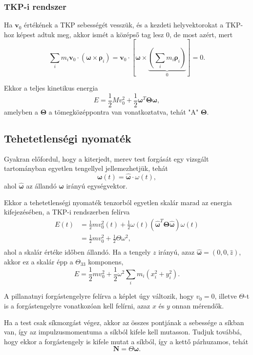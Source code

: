 \documentclass[12pt,a4paper]{scrartcl}
\let\mathbf\bm
\begin{document}
\subsubsection{TKP-i rendszer}
Ha ${{\mathbf{v}}_0}$ értékének a TKP sebességét vesszük, és a kezdeti helyvektorokat a TKP-hoz képest adtuk meg, akkor ismét a középső tag lesz 0, de most azért, mert
\[\sum\limits_i {{m_i}{{\mathbf{v}}_0} \cdot \left( {{\mathbf{\omega }} \times {{\mathbf{\rho }}_i}} \right)}  = {{\mathbf{v}}_0} \cdot \left[ {{\mathbf{\omega }} \times \underbrace {\left( {\sum\limits_i {{m_i}{{\mathbf{\rho }}_i}} } \right)}_0} \right] = 0.\]

Ekkor a teljes kinetikus energia
\[E = \frac{1}{2}Mv_0^2 + \frac{1}{2}{{\mathbf{\omega }}^T}{\mathbf{\Theta \omega }},\]
amelyben a ${\mathbf{\Theta }}$ a tömegközéppontra van vonatkoztatva, tehát "A" ${\mathbf{\Theta }}$.

\subsection{Tehetetlenségi nyomaték}
Gyakran előfordul, hogy a kiterjedt, merev test forgását egy vizsgált tartományban egyetlen tengellyel jellemezhetjük, tehát 
\[{\mathbf{\omega }}\left( t \right) = {\mathbf{\hat \omega }} \cdot \omega \left( t \right),\]
ahol ${\mathbf{\hat \omega }}$ az állandó ${\mathbf{\omega }}$ irányú egységvektor.

Ekkor a tehetetlenségi nyomaték tenzorból egyetlen skalár marad az energia kifejezésében, a TKP-i rendszerben felírva
\[\begin{aligned}
  E\left( t \right) &  = \frac{1}{2}mv_0^2\left( t \right) + \frac{1}{2}\omega \left( t \right)\left( {{{{\mathbf{\hat \omega }}}^T}{\mathbf{\Theta \hat \omega }}} \right)\omega \left( t \right) \\ 
   &  = \frac{1}{2}mv_0^2 + \frac{1}{2}\Theta {\omega ^2}, \\ 
\end{aligned} \]
ahol a skalár értéke időben állandó. Ha a tengely $z$ irányú, azaz ${\mathbf{\hat \omega }} = \left( {0,0,\hat z} \right)$, akkor ez a skalár épp a ${\Theta _{33}}$ komponens, 
\[E = \frac{1}{2}mv_0^2 + \frac{1}{2}{\omega ^2}\sum\limits_i {{m_i}\left( {x_i^2 + y_i^2} \right)}.\]

A pillanatnyi forgástengelyre felírva a képlet úgy változik, hogy $v_0=0$, illetve $\Theta$-t is a forgástengelyre vonatkozóan kell felírni, azaz $x$ és $y$ onnan mérendők.

Ha a test csak síkmozgást végez, akkor az összes pontjának a sebessége a síkban van, így az impulzusmomentuma a síkból kifele kell mutasson. Tudjuk továbbá, hogy ekkor a forgástengely is kifele mutat a síkból, így a kettő párhuzamos, tehát
\[{\mathbf{N}} = \Theta {\mathbf{\omega }}.\]
\end{document}
